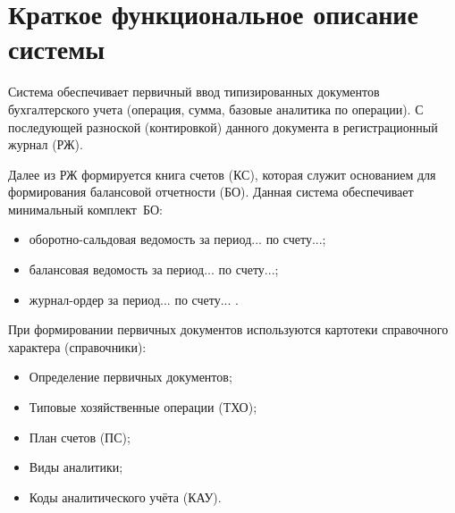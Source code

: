 \section{Краткое функциональное описание системы}

Система обеспечивает первичный ввод типизированных документов бухгалтерского учета
(операция, сумма, базовые аналитика по операции).
С последующей разноской (контировкой) данного документа в регистрационный журнал (РЖ). 

Далее из РЖ формируется книга счетов (КС),
которая служит основанием для формирования балансовой отчетности (БО).
Данная система обеспечивает минимальный комплект~БО: 

\begin{itemize}
    \item оборотно-сальдовая ведомость за период... по счету...;
    \item балансовая ведомость за период... по счету...;
    \item журнал-ордер за период... по счету... .
\end{itemize}

При формировании первичных документов используются картотеки справочного характера (справочники):

\begin{itemize}
    \item Определение первичных документов;
    \item Типовые хозяйственные операции (ТХО);
    \item План счетов (ПС);
    \item Виды аналитики;
    \item Коды аналитического учёта (КАУ).
\end{itemize}

\newpage
